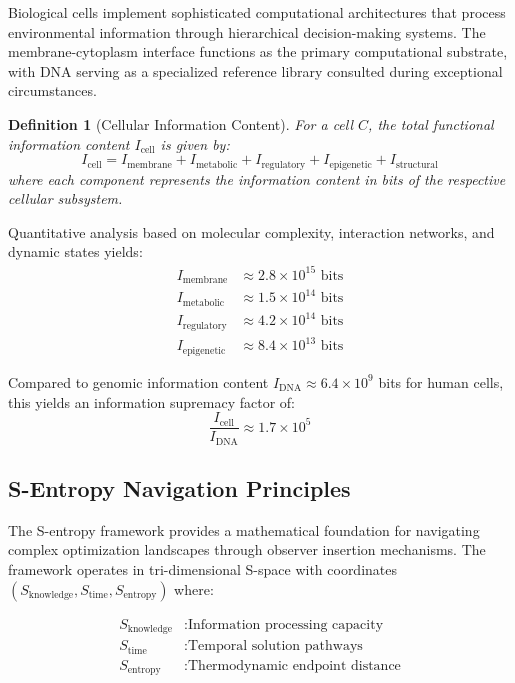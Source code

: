 \documentclass[12pt,a4paper]{article}
\newtheorem{definition}{Definition}
\begin{document}
Biological cells implement sophisticated computational architectures that process environmental information through hierarchical decision-making systems. The membrane-cytoplasm interface functions as the primary computational substrate, with DNA serving as a specialized reference library consulted during exceptional circumstances.

\begin{definition}[Cellular Information Content]
For a cell $C$, the total functional information content $I_{\text{cell}}$ is given by:
\begin{equation}
I_{\text{cell}} = I_{\text{membrane}} + I_{\text{metabolic}} + I_{\text{regulatory}} + I_{\text{epigenetic}} + I_{\text{structural}}
\end{equation}
where each component represents the information content in bits of the respective cellular subsystem.
\end{definition}

Quantitative analysis based on molecular complexity, interaction networks, and dynamic states yields:
\begin{align}
I_{\text{membrane}} &\approx 2.8 \times 10^{15} \text{ bits} \\
I_{\text{metabolic}} &\approx 1.5 \times 10^{14} \text{ bits} \\
I_{\text{regulatory}} &\approx 4.2 \times 10^{14} \text{ bits} \\
I_{\text{epigenetic}} &\approx 8.4 \times 10^{13} \text{ bits}
\end{align}

Compared to genomic information content $I_{\text{DNA}} \approx 6.4 \times 10^9$ bits for human cells, this yields an information supremacy factor of:
\begin{equation}
\frac{I_{\text{cell}}}{I_{\text{DNA}}} \approx 1.7 \times 10^5
\end{equation}

\subsection{S-Entropy Navigation Principles}

The S-entropy framework provides a mathematical foundation for navigating complex optimization landscapes through observer insertion mechanisms. The framework operates in tri-dimensional S-space with coordinates $(S_{\text{knowledge}}, S_{\text{time}}, S_{\text{entropy}})$ where:

\begin{align}
S_{\text{knowledge}} &: \text{Information processing capacity} \\
S_{\text{time}} &: \text{Temporal solution pathways} \\
S_{\text{entropy}} &: \text{Thermodynamic endpoint distance}
\end{align}
\end{document}
